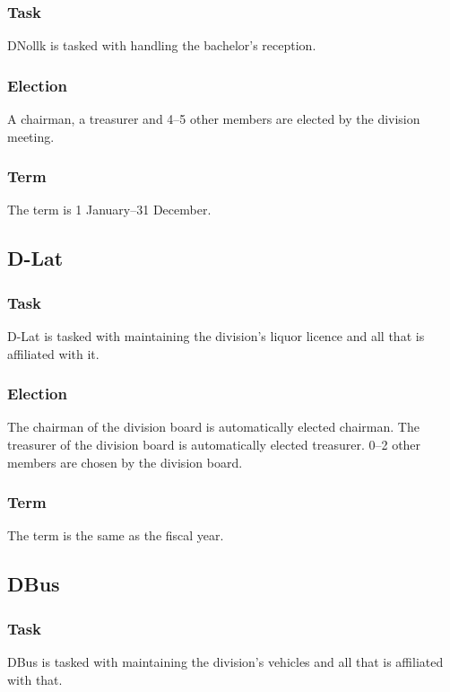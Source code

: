 \subsubsection{Task}
DNollk is tasked with handling the bachelor's reception. 

\subsubsection{Election}
A chairman, a treasurer and 4--5 other members are elected by the division meeting. 

\subsubsection{Term}
The term is 1 January--31 December.

\subsection{D-Lat}

\subsubsection{Task}
D-Lat is tasked with maintaining the division's liquor licence and all that is affiliated with it.

\subsubsection{Election}
The chairman of the division board is automatically elected chairman. The treasurer of the division board is automatically elected treasurer. 0--2 other members are chosen by the division board. 

\subsubsection{Term}
The term is the same as the fiscal year. 

\subsection{DBus}

\subsubsection{Task}
DBus is tasked with maintaining the division's vehicles and all that is affiliated with that. 

